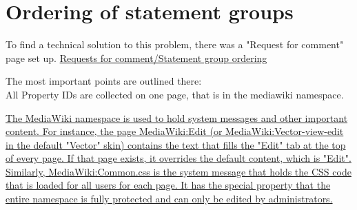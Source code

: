 \section{Ordering of statement groups}

To find a technical solution to this problem, there was a "Request for comment" page set up. \href{https://www.mediawiki.org/wiki/Requests_for_comment/Statement_group_ordering}{Requests for comment/Statement group ordering}

The most important points are outlined there: \\
All Property IDs are collected on one page, that is in the mediawiki namespace. 

\href{https://www.mediawiki.org/wiki/Help:Namespaces#MediaWiki}{The MediaWiki namespace is used to hold system messages and other important content. For instance, the page MediaWiki:Edit (or MediaWiki:Vector-view-edit in the default "Vector" skin) contains the text that fills the "Edit" tab at the top of every page. If that page exists, it overrides the default content, which is "Edit". Similarly, MediaWiki:Common.css is the system message that holds the CSS code that is loaded for all users for each page. It has the special property that the entire namespace is fully protected and can only be edited by administrators.} 

